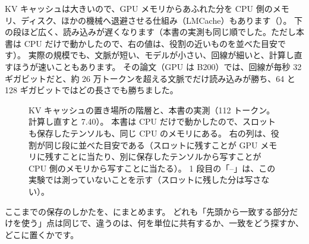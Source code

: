 KV キャッシュは大きいので、GPU メモリからあふれた分を CPU 側のメモリ、ディスク、ほかの機械へ退避させる仕組み（LMCache）もあります\cite{liu2025lmcache}（）。
下の段ほど広く、読み込みが遅くなります（本書の実測も同じ順でした。ただし本書は CPU だけで動かしたので、右の値は、役割の近いものを並べた目安です）。
実際の規模でも、文脈が短い、モデルが小さい、回線が細いと、計算し直すほうが速いこともあります\cite{liu2023cachegen,liu2025lmcache}。
その論文（GPU は B200）では、回線が毎秒 32 ギガビットだと、約 26 万トークンを超える文脈でだけ読み込みが勝ち、64 と 128 ギガビットではどの長さでも勝ちました。

\begin{figure}[htbp]
\centering
{}
\caption{KV キャッシュの置き場所の階層と、本書の実測（112 トークン。計算し直すと 7.40）。
本書は CPU だけで動かしたので、スロットも保存したテンソルも、同じ CPU のメモリにある。
右の列は、役割が同じ段に並べた目安である（スロットに残すことが GPU メモリに残すことに当たり、別に保存したテンソルから写すことが CPU 側のメモリから写すことに当たる）。
1 段目の「--」は、この実験では測っていないことを示す（スロットに残した分は写さない）。}
\label{fig:es-cache-tiers}
\end{figure}

ここまでの保存のしかたを、にまとめます。
どれも「先頭から一致する部分だけを使う」点は同じで、違うのは、何を単位に共有するか、一致をどう探すか、どこに置くかです。

